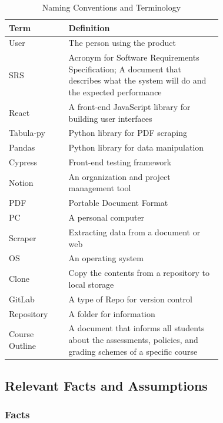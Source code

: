 \documentclass[12pt, titlepage]{article}
\begin{document}
\begin{table}[!hb]
\begin{center}
    \centering
    \begin{tabular}{|l|p{0.72\linewidth}|}
     \hline
     \textbf{Term} & \textbf{Definition} \\
     \hline
     User & The person using the product \\
     \hline
     SRS & Acronym for Software Requirements Specification; A document that describes what the system will do and the expected performance \\
     \hline
     React & A front-end JavaScript library for building user interfaces\\
     \hline
     Tabula-py & Python library for PDF scraping \\
     \hline
     Pandas & Python library for data manipulation \\
     \hline
     Cypress & Front-end testing framework \\
     \hline
     Notion & An organization and project management tool \\
     \hline
     PDF & Portable Document Format \\
     \hline
     PC & A personal computer \\
     \hline
     Scraper & Extracting data from a document or web \\
     \hline
     OS & An operating system\\
     \hline
     Clone & Copy the contents from a repository to local storage  \\
     \hline
     GitLab & A type of Repo for version control \\
     \hline
     Repository & A folder for information \\
     \hline
     Course Outline & A document that informs all students about the assessments, policies, and grading schemes of a specific course \\
     \hline
    \end{tabular}
    \caption{Naming Conventions and Terminology}
    \end{center}
\end{table}

\newpage

\subsection{Relevant Facts and Assumptions}

\subsubsection{Facts}
\end{document}
